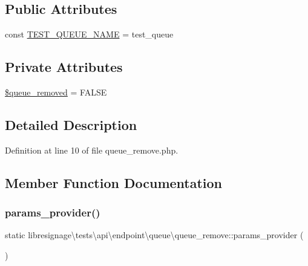 \subsection*{Public Attributes}
\begin{DoxyCompactItemize}
\item 
const \hyperlink{classlibresignage_1_1tests_1_1api_1_1endpoint_1_1queue_1_1queue__remove_a9439b6ec78404f43211b3d90fed09fa9}{T\+E\+S\+T\+\_\+\+Q\+U\+E\+U\+E\+\_\+\+N\+A\+ME} = \textquotesingle{}test\+\_\+queue\textquotesingle{}
\end{DoxyCompactItemize}
\subsection*{Private Attributes}
\begin{DoxyCompactItemize}
\item 
\hyperlink{classlibresignage_1_1tests_1_1api_1_1endpoint_1_1queue_1_1queue__remove_aa8d10cb64642dcfb92489a4e0e882ec7}{\$queue\+\_\+removed} = F\+A\+L\+SE
\end{DoxyCompactItemize}


\subsection{Detailed Description}


Definition at line 10 of file queue\+\_\+remove.\+php.



\subsection{Member Function Documentation}
\mbox{\label{classlibresignage_1_1tests_1_1api_1_1endpoint_1_1queue_1_1queue__remove_a01d556e6258d040f1b07aedf42442886}} 
\subsubsection{\texorpdfstring{params\+\_\+provider()}{params\_provider()}}
{\footnotesize\ttfamily static libresignage\textbackslash{}tests\textbackslash{}api\textbackslash{}endpoint\textbackslash{}queue\textbackslash{}queue\+\_\+remove\+::params\+\_\+provider (\begin{DoxyParamCaption}{ }\end{DoxyParamCaption})\hspace{0.3cm}{\ttfamily [static]}}



